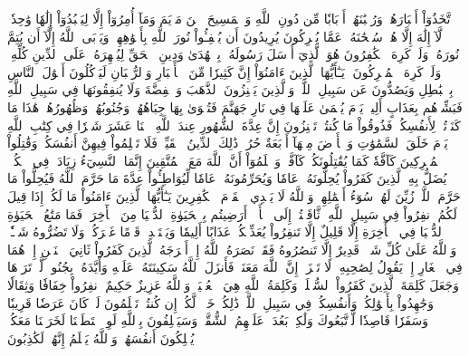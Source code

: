 ٱتَّخَذُوٓاْ أَحۡبَارَهُمۡ وَرُهۡبَٰنَهُمۡ أَرۡبَابٗا مِّن دُونِ ٱللَّهِ وَٱلۡمَسِيحَ ٱبۡنَ مَرۡيَمَ وَمَآ أُمِرُوٓاْ إِلَّا لِيَعۡبُدُوٓاْ إِلَٰهٗا وَٰحِدٗاۖ لَّآ إِلَٰهَ إِلَّا هُوَۚ سُبۡحَٰنَهُۥ عَمَّا يُشۡرِكُونَ
يُرِيدُونَ أَن يُطۡفِـُٔواْ نُورَ ٱللَّهِ بِأَفۡوَٰهِهِمۡ وَيَأۡبَى ٱللَّهُ إِلَّآ أَن يُتِمَّ نُورَهُۥ وَلَوۡ كَرِهَ ٱلۡكَٰفِرُونَ
هُوَ ٱلَّذِيٓ أَرۡسَلَ رَسُولَهُۥ بِٱلۡهُدَىٰ وَدِينِ ٱلۡحَقِّ لِيُظۡهِرَهُۥ عَلَى ٱلدِّينِ كُلِّهِۦ وَلَوۡ كَرِهَ ٱلۡمُشۡرِكُونَ
۞يَـٰٓأَيُّهَا ٱلَّذِينَ ءَامَنُوٓاْ إِنَّ كَثِيرٗا مِّنَ ٱلۡأَحۡبَارِ وَٱلرُّهۡبَانِ لَيَأۡكُلُونَ أَمۡوَٰلَ ٱلنَّاسِ بِٱلۡبَٰطِلِ وَيَصُدُّونَ عَن سَبِيلِ ٱللَّهِۗ وَٱلَّذِينَ يَكۡنِزُونَ ٱلذَّهَبَ وَٱلۡفِضَّةَ وَلَا يُنفِقُونَهَا فِي سَبِيلِ ٱللَّهِ فَبَشِّرۡهُم بِعَذَابٍ أَلِيمٖ
يَوۡمَ يُحۡمَىٰ عَلَيۡهَا فِي نَارِ جَهَنَّمَ فَتُكۡوَىٰ بِهَا جِبَاهُهُمۡ وَجُنُوبُهُمۡ وَظُهُورُهُمۡۖ هَٰذَا مَا كَنَزۡتُمۡ لِأَنفُسِكُمۡ فَذُوقُواْ مَا كُنتُمۡ تَكۡنِزُونَ
إِنَّ عِدَّةَ ٱلشُّهُورِ عِندَ ٱللَّهِ ٱثۡنَا عَشَرَ شَهۡرٗا فِي كِتَٰبِ ٱللَّهِ يَوۡمَ خَلَقَ ٱلسَّمَٰوَٰتِ وَٱلۡأَرۡضَ مِنۡهَآ أَرۡبَعَةٌ حُرُمٞۚ ذَٰلِكَ ٱلدِّينُ ٱلۡقَيِّمُۚ فَلَا تَظۡلِمُواْ فِيهِنَّ أَنفُسَكُمۡۚ وَقَٰتِلُواْ ٱلۡمُشۡرِكِينَ كَآفَّةٗ كَمَا يُقَٰتِلُونَكُمۡ كَآفَّةٗۚ وَٱعۡلَمُوٓاْ أَنَّ ٱللَّهَ مَعَ ٱلۡمُتَّقِينَ
إِنَّمَا ٱلنَّسِيٓءُ زِيَادَةٞ فِي ٱلۡكُفۡرِۖ يُضَلُّ بِهِ ٱلَّذِينَ كَفَرُواْ يُحِلُّونَهُۥ عَامٗا وَيُحَرِّمُونَهُۥ عَامٗا لِّيُوَاطِـُٔواْ عِدَّةَ مَا حَرَّمَ ٱللَّهُ فَيُحِلُّواْ مَا حَرَّمَ ٱللَّهُۚ زُيِّنَ لَهُمۡ سُوٓءُ أَعۡمَٰلِهِمۡۗ وَٱللَّهُ لَا يَهۡدِي ٱلۡقَوۡمَ ٱلۡكَٰفِرِينَ
يَـٰٓأَيُّهَا ٱلَّذِينَ ءَامَنُواْ مَا لَكُمۡ إِذَا قِيلَ لَكُمُ ٱنفِرُواْ فِي سَبِيلِ ٱللَّهِ ٱثَّاقَلۡتُمۡ إِلَى ٱلۡأَرۡضِۚ أَرَضِيتُم بِٱلۡحَيَوٰةِ ٱلدُّنۡيَا مِنَ ٱلۡأٓخِرَةِۚ فَمَا مَتَٰعُ ٱلۡحَيَوٰةِ ٱلدُّنۡيَا فِي ٱلۡأٓخِرَةِ إِلَّا قَلِيلٌ
إِلَّا تَنفِرُواْ يُعَذِّبۡكُمۡ عَذَابًا أَلِيمٗا وَيَسۡتَبۡدِلۡ قَوۡمًا غَيۡرَكُمۡ وَلَا تَضُرُّوهُ شَيۡـٔٗاۗ وَٱللَّهُ عَلَىٰ كُلِّ شَيۡءٖ قَدِيرٌ
إِلَّا تَنصُرُوهُ فَقَدۡ نَصَرَهُ ٱللَّهُ إِذۡ أَخۡرَجَهُ ٱلَّذِينَ كَفَرُواْ ثَانِيَ ٱثۡنَيۡنِ إِذۡ هُمَا فِي ٱلۡغَارِ إِذۡ يَقُولُ لِصَٰحِبِهِۦ لَا تَحۡزَنۡ إِنَّ ٱللَّهَ مَعَنَاۖ فَأَنزَلَ ٱللَّهُ سَكِينَتَهُۥ عَلَيۡهِ وَأَيَّدَهُۥ بِجُنُودٖ لَّمۡ تَرَوۡهَا وَجَعَلَ كَلِمَةَ ٱلَّذِينَ كَفَرُواْ ٱلسُّفۡلَىٰۗ وَكَلِمَةُ ٱللَّهِ هِيَ ٱلۡعُلۡيَاۗ وَٱللَّهُ عَزِيزٌ حَكِيمٌ
ٱنفِرُواْ خِفَافٗا وَثِقَالٗا وَجَٰهِدُواْ بِأَمۡوَٰلِكُمۡ وَأَنفُسِكُمۡ فِي سَبِيلِ ٱللَّهِۚ ذَٰلِكُمۡ خَيۡرٞ لَّكُمۡ إِن كُنتُمۡ تَعۡلَمُونَ
لَوۡ كَانَ عَرَضٗا قَرِيبٗا وَسَفَرٗا قَاصِدٗا لَّٱتَّبَعُوكَ وَلَٰكِنۢ بَعُدَتۡ عَلَيۡهِمُ ٱلشُّقَّةُۚ وَسَيَحۡلِفُونَ بِٱللَّهِ لَوِ ٱسۡتَطَعۡنَا لَخَرَجۡنَا مَعَكُمۡ يُهۡلِكُونَ أَنفُسَهُمۡ وَٱللَّهُ يَعۡلَمُ إِنَّهُمۡ لَكَٰذِبُونَ
